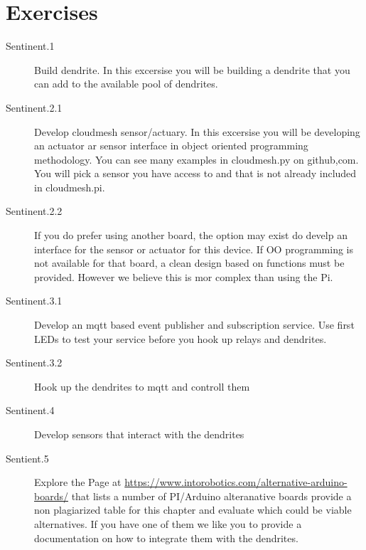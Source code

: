\section{Exercises}

\begin{description}

\item[Sentinent.1] Build dendrite. In this excersise you will be
  building a dendrite that you can add to the available pool of dendrites.
\item[Sentinent.2.1] Develop cloudmesh sensor/actuary. In this excersise
  you will be developing an actuator ar sensor interface in object
  oriented programming methodology. You can see many examples in
  cloudmesh.py on github,com. You will pick a sensor you have access
  to and that is not already included in cloudmesh.pi. 
\item[Sentinent.2.2] If you do
  prefer using another board, the option may exist do develp an
  interface for the sensor or actuator for this device. If OO
  programming is not available for that board, a clean design based on
  functions must be provided. However we believe this is mor complex
  than using the Pi. 
\item[Sentinent.3.1] Develop an mqtt based event publisher and
  subscription service. Use first LEDs to test your service before you
  hook up relays and dendrites.
\item[Sentinent.3.2] Hook up the dendrites to mqtt and controll them
\item[Sentinent.4] Develop sensors that interact with the dendrites
\item[Sentient.5] Explore the Page at
  \url{https://www.intorobotics.com/alternative-arduino-boards/} that
  lists a number of PI/Arduino alteranative boards provide a non
  plagiarized table for this chapter and evaluate which could be
  viable alternatives. If you have one of them we like you to provide
  a documentation on how to integrate them with the dendrites.

\end{description}

 